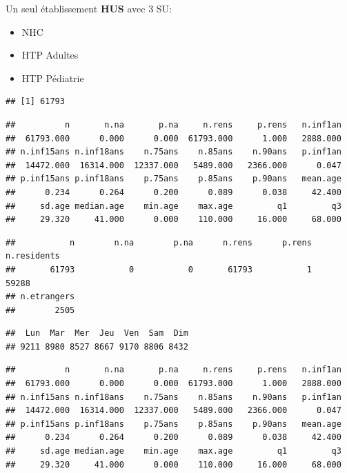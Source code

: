 \documentclass[]{article}
\begin{document}
Un seul établissement \textbf{HUS} avec 3 SU:

\begin{itemize}
\itemsep1pt\parskip0pt
\item
  NHC
\item
  HTP Adultes
\item
  HTP Pédiatrie
\end{itemize}

\begin{verbatim}
## [1] 61793
\end{verbatim}

\begin{verbatim}
##          n       n.na       p.na     n.rens     p.rens   n.inf1an 
##  61793.000      0.000      0.000  61793.000      1.000   2888.000 
## n.inf15ans n.inf18ans    n.75ans    n.85ans    n.90ans   p.inf1an 
##  14472.000  16314.000  12337.000   5489.000   2366.000      0.047 
## p.inf15ans p.inf18ans    p.75ans    p.85ans    p.90ans   mean.age 
##      0.234      0.264      0.200      0.089      0.038     42.400 
##     sd.age median.age    min.age    max.age         q1         q3 
##     29.320     41.000      0.000    110.000     16.000     68.000
\end{verbatim}

\begin{verbatim}
##           n        n.na        p.na      n.rens      p.rens n.residents 
##       61793           0           0       61793           1       59288 
## n.etrangers 
##        2505
\end{verbatim}

\begin{verbatim}
##  Lun  Mar  Mer  Jeu  Ven  Sam  Dim 
## 9211 8980 8527 8667 9170 8806 8432
\end{verbatim}

\begin{verbatim}
##          n       n.na       p.na     n.rens     p.rens   n.inf1an 
##  61793.000      0.000      0.000  61793.000      1.000   2888.000 
## n.inf15ans n.inf18ans    n.75ans    n.85ans    n.90ans   p.inf1an 
##  14472.000  16314.000  12337.000   5489.000   2366.000      0.047 
## p.inf15ans p.inf18ans    p.75ans    p.85ans    p.90ans   mean.age 
##      0.234      0.264      0.200      0.089      0.038     42.400 
##     sd.age median.age    min.age    max.age         q1         q3 
##     29.320     41.000      0.000    110.000     16.000     68.000
\end{verbatim}
\end{document}
